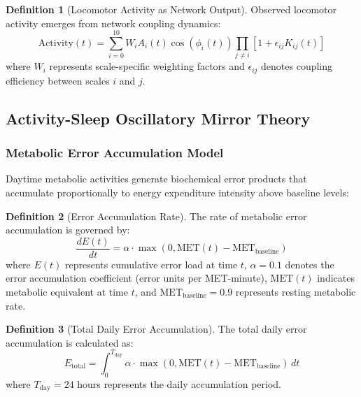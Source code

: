 \documentclass[12pt,a4paper]{article}
\theoremstyle{definition}
\newtheorem{definition}{Definition}[section]
\begin{document}
\begin{definition}[Locomotor Activity as Network Output]
Observed locomotor activity emerges from network coupling dynamics:
\begin{equation}
\text{Activity}(t) = \sum_{i=0}^{10} W_i A_i(t) \cos(\phi_i(t)) \prod_{j \neq i} [1 + \epsilon_{ij} K_{ij}(t)]
\label{eq:activity_output}
\end{equation}
where $W_i$ represents scale-specific weighting factors and $\epsilon_{ij}$ denotes coupling efficiency between scales $i$ and $j$.
\end{definition}

\subsection{Activity-Sleep Oscillatory Mirror Theory}

\subsubsection{Metabolic Error Accumulation Model}

Daytime metabolic activities generate biochemical error products that accumulate proportionally to energy expenditure intensity above baseline levels:

\begin{definition}[Error Accumulation Rate]
The rate of metabolic error accumulation is governed by:
\begin{equation}
\frac{dE(t)}{dt} = \alpha \cdot \max(0, \text{MET}(t) - \text{MET}_{\text{baseline}})
\label{eq:error_rate}
\end{equation}
where $E(t)$ represents cumulative error load at time $t$, $\alpha = 0.1$ denotes the error accumulation coefficient (error units per MET-minute), $\text{MET}(t)$ indicates metabolic equivalent at time $t$, and $\text{MET}_{\text{baseline}} = 0.9$ represents resting metabolic rate.
\end{definition}

\begin{definition}[Total Daily Error Accumulation]
The total daily error accumulation is calculated as:
\begin{equation}
E_{\text{total}} = \int_0^{T_{\text{day}}} \alpha \cdot \max(0, \text{MET}(t) - \text{MET}_{\text{baseline}}) \, dt
\label{eq:total_error}
\end{equation}
where $T_{\text{day}} = 24$ hours represents the daily accumulation period.
\end{definition}
\end{document}
